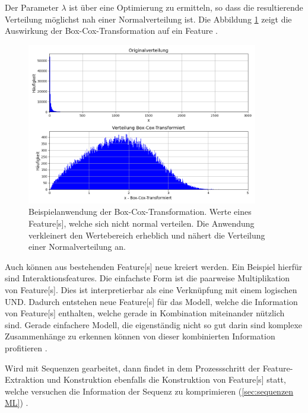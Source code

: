 Der Parameter \(\lambda\) ist über eine Optimierung zu ermitteln, so dass die resultierende Verteilung möglichst nah einer Normalverteilung ist. Die Abbildung \ref{fig:bspBoxCox} zeigt die Auswirkung der Box-Cox-Transformation auf ein \gls{Feature} \cite{Zheng.2018}. 

\begin{figure}[htb]
    \centering
    \includegraphics[width=0.9\textwidth]{img/Plots/Box-Cox-Transfomation.png}
    \caption[Beispielanwendung der Box-Cox-Transformation.]{Beispielanwendung der Box-Cox-Transformation. Werte eines \gls{Feature}[s], welche sich nicht normal verteilen. Die Anwendung verkleinert den Wertebereich erheblich und nähert die Verteilung einer Normalverteilung an.}
    \label{fig:bspBoxCox}
\end{figure}

Auch können aus bestehenden \gls{Feature}[s] neue kreiert werden. Ein Beispiel hierfür sind Interaktionsfeatures. Die einfachste Form ist die paarweise Multiplikation von \gls{Feature}[s]. Dies ist interpretierbar als eine Verknüpfung mit einem logischen UND. Dadurch entstehen neue \gls{Feature}[s] für das Modell, welche die Information von \gls{Feature}[s] enthalten, welche gerade in Kombination miteinander nützlich sind. Gerade einfachere Modell, die eigenständig nicht so gut darin sind komplexe Zusammenhänge zu erkennen können von dieser kombinierten Information profitieren \cite{Zheng.2018}.\par

Wird mit Sequenzen gearbeitet, dann findet in dem Prozessschritt der \gls{Feature}-Extraktion und Konstruktion ebenfalls die Konstruktion von \gls{Feature}[s] statt, welche versuchen die Information der Sequenz zu komprimieren (\ref{sec:sequenzen ML}) \cite{Nielsen.2020}. 

